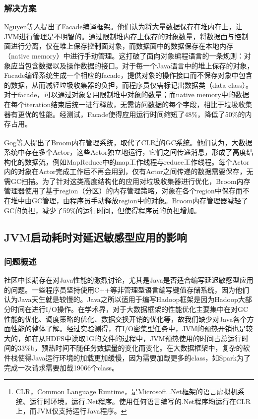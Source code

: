 \documentclass[lang=cn,12pt,a4paper,cite=authoryear]{elegantpaper}
\begin{document}
\subsubsection{解决方案}
Nguyen等人提出了Facade\cite{DBLP:conf/asplos/NguyenWBFHX15}编译框架。他们认为将大量数据保存在堆内存上，让JVM进行管理是不明智的。通过限制堆内存上保存的对象数量，将数据面与控制面进行分离，仅在堆上保存控制面对象，而数据面中的数据保存在本地内存（native memory）中进行手动管理。这打破了面向对象编程语言的一条规则：对象应当包含数据以及操作数据的接口。对于每一个Java语言中的堆上保存的对象，Facade编译系统生成一个相应的facade，提供对象的操作接口而不保存对象中包含的数据，从而减轻垃圾收集器的负担，而程序员仅需标记出数据类（data class）。对于facade，可以通过对象复用限制堆中对象的数量；而native memory中的数据在每个iteration结束后统一进行释放，无需访问数据的每个字段，相比于垃圾收集器有更优的性能。经测试，Facade使得应用运行时间缩短了48\%，降低了50\%的内存占用。

Gog等人提出了Broom\cite{DBLP:conf/hotos/GogGSVVRCMHI15}内存管理系统，取代了CLR\footnote{CLR\cite{DBLP:conf/indin/CavalieriSG16}，Common Language Runtime，是Microsoft .Net框架的语言虚拟机系统、运行时环境，运行.Net程序。使用任何语言编写的.Net程序均运行在CLR上，而JVM仅支持运行Java程序。}的GC系统。他们认为，大数据系统中存在多个Actor，这些Actor独立地运行，它们之间传递消息，形成了高度结构化的数据流，例如MapReduce\cite{DBLP:journals/cacm/DeanG08}中的map工作线程与reduce工作线程。每个Actor内的对象在Actor完成工作后不再会用到，仅有Actor之间传递的数据需要保存，无需GC扫描。为了针对这类高度结构化的应用对垃圾收集器进行优化，Broom内存管理器使用了基于region（分区）的内存管理策略\cite{DBLP:conf/padl/ElsmanH20}，对象在各个region中保存而不在堆中由GC管理，由程序员手动释放region中的对象。Broom内存管理器减轻了GC的负担，减少了59\%的运行时间，但使得程序员的负担增加。

\subsection{JVM启动耗时对延迟敏感型应用的影响}
\subsubsection{问题概述}
社区中长期存在对Java性能的激烈讨论，尤其是Java是否适合编写延迟敏感型应用的问题\cite{debate1,debate2,debate3,debate4}。一些程序员坚持使用C++等非管理型语言编写键值存储系统，因为他们认为Java天生就是较慢的。Java之所以适用于编写Hadoop框架是因为Hadoop大部分时间在进行I/O操作\cite{why}。在学术界，对于大数据框架的性能优化主要集中在对GC性能的优化、调度策略的优化、数据交换开销的优化等，故我们缺少对Java各个方面性能的整体了解。经过实验测得，在I/O密集型任务中，JVM的预热开销也是较大的，如在从HDFS中读取1G的文件的过程中，JVM预热使用的时间占总运行时间的33\%b\cite{DBLP:conf/osdi/LionCSZGY16}，预热时间不随任务数据量的变化而变化。在大数据框架中，复杂的软件栈使得Java运行环境的加载更加缓慢，因为需要加载更多的class，如Spark为了完成一次请求需要加载19066个class。
\end{document}
